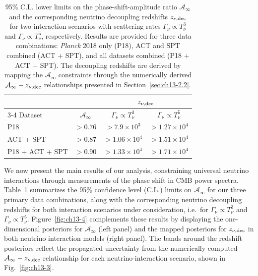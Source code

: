 \begin{table}
	\centering
	\begin{tabular}{l c @{\hskip 2em} c @{\hskip 1em} c}
			\toprule
			& & \multicolumn{2}{c}{$z_{\nu,\rm dec}$}\\
            \cmidrule(lr){3-4}
	Dataset & {$\mathcal{A}_\infty$} & {$\Gamma_\nu\propto T_\nu^3$} & {$\Gamma_\nu\propto T_\nu^5$} \\
            \midrule[0.065em]
	P18 & $>0.76$	& $> 7.9\times 10^3$	& $>1.27\times 10^4$	\\[4pt]
        ACT + SPT & $>0.87$	& $> 1.06\times 10^4$	& $>1.51\times 10^4$	\\[4pt]
        P18 + ACT + SPT & $>0.90$	& $> 1.33\times 10^4$	& $>1.71\times 10^4$ \\[2pt]
	\bottomrule
	\end{tabular}
	\caption[Constraints on the phase-shift amplitude and neutrino decoupling redshift]{95\% C.L. lower limits on the phase-shift-amplitude ratio $\mathcal{A}_\infty$ and the corresponding neutrino decoupling redshifts $z_{\nu,\rm dec}$ for two interaction scenarios with scattering rates $\Gamma_\nu \propto T_\nu^3$ and $\Gamma_\nu \propto T_\nu^5$, respectively. Results are provided for three data combinations: \textit{Planck} 2018 only (P18), ACT and SPT combined (ACT + SPT), and all datasets combined (P18 + ACT + SPT). The decoupling redshifts are derived by mapping the $\mathcal{A}_\infty$ constraints through the numerically derived $\mathcal{A}_\infty - z_{\nu,\rm dec}$ relationships presented in Section~\ref{sec:ch13-2.2}.}
	\label{tab:ch13-1}
\end{table}

\noindent We now present the main results of our analysis, constraining universal neutrino interactions through measurements of the phase shift in CMB power spectra. Table~\ref{tab:ch13-1} summarizes the 95\% confidence level (C.L.) limits on $\mathcal{A}_\infty$ for our three primary data combinations, along with the corresponding neutrino decoupling redshifts for both interaction scenarios under consideration, i.e.\ for $\Gamma_\nu\propto T_\nu^3$ and $\Gamma_\nu\propto T_\nu^5$. Figure~\ref{fig:ch13-4} complements these results by displaying the one-dimensional posteriors for $\mathcal{A}_\infty$ (left panel) and the mapped posteriors for $z_{\nu,\rm dec}$ in both neutrino interaction models (right panel). The bands around the redshift posteriors reflect the propagated uncertainty from the numerically computed $\mathcal{A}_\infty - z_{\nu,\rm dec}$ relationship for each neutrino-interaction scenario, shown in Fig.~\ref{fig:ch13-3}.

